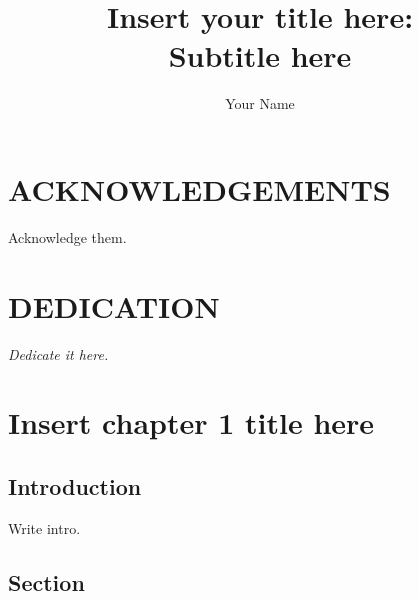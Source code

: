 \documentclass[
]{DissertateCUNY}
\title{Insert your title here:\\
Subtitle here}
\author{Your Name}
\date{}
\begin{document}
\maketitle

\copyrightpage
\approvalpage
\abstractpage

\newpage
{}
\fancyhead[R]{\thepage}
\fancyfoot[C]{}
\chapter*{ACKNOWLEDGEMENTS}

Acknowledge them.

\newpage
{}
\fancyhead[R]{\thepage}
\fancyfoot[C]{}
\tableofcontents

\newpage
{}
\fancyhead[R]{\thepage}
\fancyfoot[C]{}
\listoftables

\newpage
{}
\fancyhead[R]{\thepage}
\fancyfoot[C]{}
\listoffigures

\newpage
{}
\fancyhead[R]{\thepage}
\fancyfoot[C]{}
\chapter*{DEDICATION}

\hspace{0pt}
\vfill

\textit{Dedicate it here.} \vfill \hspace{0pt}

\newpage
{}

\newpage
{}
\fancyhead[R]{\thepage}
\fancyfoot[C]{}

\chapter{Insert chapter 1 title here}

\doublespacing

\hypertarget{introduction}{%
\section*{Introduction}\label{introduction}}

Write intro.

\hypertarget{section}{%
\section{Section}\label{section}}
\end{document}
